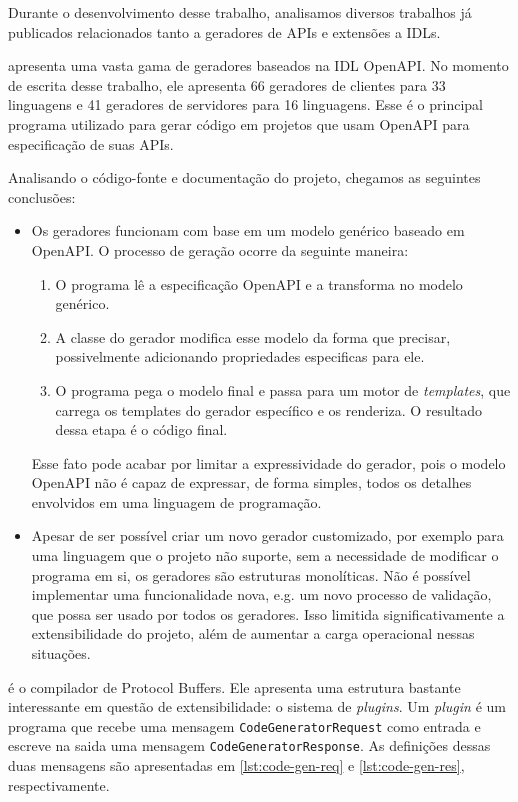 Durante o desenvolvimento desse trabalho, analisamos diversos trabalhos já publicados
relacionados tanto a geradores de APIs e extensões a IDLs.

\cite{openapi:gen} apresenta uma vasta gama de geradores baseados na IDL OpenAPI. No
momento de escrita desse trabalho, ele apresenta 66 geradores de clientes para 33
linguagens e 41 geradores de servidores para 16 linguagens. Esse é o principal programa
utilizado para gerar código em projetos que usam OpenAPI para especificação de suas
APIs.

Analisando o código-fonte e documentação do projeto, chegamos as seguintes conclusões:

\begin{itemize}
\item
  Os geradores funcionam com base em um modelo genérico baseado em OpenAPI. O processo
  de geração ocorre da seguinte maneira:

  \begin{enumerate}
  \item
    O programa lê a especificação OpenAPI e a transforma no modelo genérico.
  \item
    A classe do gerador modifica esse modelo da forma que precisar, possivelmente
    adicionando propriedades especificas para ele.
  \item
    O programa pega o modelo final e passa para um motor de \textit{templates}, que
    carrega os templates do gerador específico e os renderiza. O resultado dessa
    etapa é o código final.
  \end{enumerate}

  Esse fato pode acabar por limitar a expressividade do gerador, pois o modelo
  OpenAPI não é capaz de expressar, de forma simples, todos os detalhes envolvidos
  em uma linguagem de programação.
\item
  Apesar de ser possível criar um novo gerador customizado, por exemplo para uma
  linguagem que o projeto não suporte, sem a necessidade de modificar o programa
  em si, os geradores são estruturas monolíticas. Não é possível implementar uma
  funcionalidade nova, e.g. um novo processo de validação, que possa ser usado por
  todos os geradores. Isso limitida significativamente a extensibilidade do projeto,
  além de aumentar a carga operacional nessas situações.
\end{itemize}

\cite{googl:protobuf} é o compilador de Protocol Buffers. Ele apresenta uma estrutura
bastante interessante em questão de extensibilidade: o sistema de \textit{plugins}.
Um \textit{plugin} é um programa que recebe uma mensagem \texttt{CodeGeneratorRequest}
como entrada e escreve na saida uma mensagem \texttt{CodeGeneratorResponse}. As
definições dessas duas mensagens são apresentadas em \cref{lst:code-gen-req} e
\cref{lst:code-gen-res}, respectivamente.

